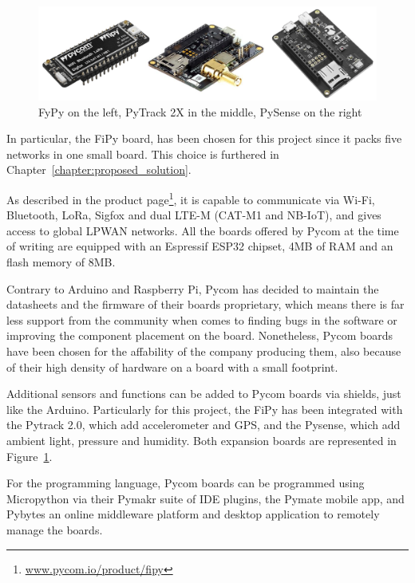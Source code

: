 			\begin{figure}
				\centering
				\includegraphics[width=\textwidth]{resources/img/chap3/pycom_board}
				\caption{FyPy on the left, PyTrack 2X in the middle, PySense on the right}
				\label{img:pycom_board}
			\end{figure}	
			
			In particular, the FiPy board, has been chosen for this project since it packs five networks in one small board.
			This choice is furthered in Chapter~\ref{chapter:proposed_solution}.
			
			As described in the product page\footnote{ \url{www.pycom.io/product/fipy}}, it is capable to communicate via Wi-Fi, Bluetooth, LoRa, Sigfox and dual LTE-M (CAT-M1 and NB-IoT), and gives access to global LPWAN networks.
			All the boards offered by Pycom at the time of writing are equipped with an Espressif ESP32 chipset, 4MB of RAM and an flash memory of 8MB.
			
			Contrary to Arduino and Raspberry Pi, Pycom has decided to maintain the datasheets and the firmware of their boards proprietary, which means there is far less support from the community when comes to finding bugs in the software or improving the component placement on the board.
			Nonetheless, Pycom boards have been chosen for the affability of the company producing them, also because of their high density of hardware on a board with a small footprint.
			
			Additional sensors and functions can be added to Pycom boards via shields, just like the Arduino.
			Particularly for this project, the FiPy has been integrated with the Pytrack 2.0, which add accelerometer and GPS, and the Pysense, which add ambient light, pressure and humidity.
			Both expansion boards are represented in Figure~\ref{img:pycom_board}.
					
			For the programming language, Pycom boards can be programmed using Micropython via their Pymakr suite of IDE plugins, the Pymate mobile app, and Pybytes an online middleware platform and desktop application to remotely manage the boards.
			

